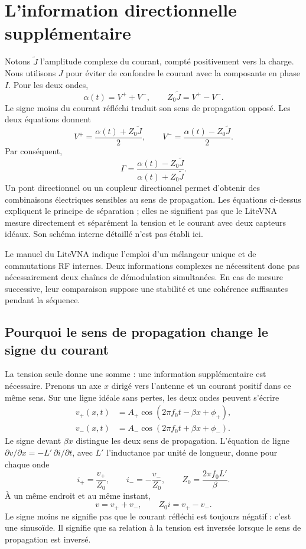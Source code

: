 \documentclass[11pt,a4paper]{article}
\begin{document}
\section{L'information directionnelle supplémentaire}
Notons $\widetilde J$ l'amplitude complexe du courant, compté positivement
vers la charge. Nous utilisons $J$ pour éviter de confondre le courant avec
la composante en phase $I$. Pour les deux ondes,
\begin{equation}
 \alpha(t)=V^++V^-,\qquad
 Z_0\widetilde J=V^+-V^-.
\end{equation}
Le signe moins du courant réfléchi traduit son sens de propagation opposé.
Les deux équations donnent
\begin{equation}
 \boxed{V^+=\frac{\alpha(t)+Z_0\widetilde J}{2},\qquad
 V^-=\frac{\alpha(t)-Z_0\widetilde J}{2}.}
\end{equation}
Par conséquent,
\begin{equation}
 \boxed{\Gamma=
 \frac{\alpha(t)-Z_0\widetilde J}
      {\alpha(t)+Z_0\widetilde J}.}
\end{equation}
Un pont directionnel ou un coupleur directionnel permet d'obtenir des
combinaisons électriques sensibles au sens de propagation. Les équations
ci-dessus expliquent le principe de séparation ; elles ne signifient pas
que le LiteVNA mesure directement et séparément la tension et le courant
avec deux capteurs idéaux. Son schéma interne détaillé n'est pas établi ici.

Le manuel du LiteVNA indique l'emploi d'un mélangeur unique et de
commutations RF internes. Deux informations complexes ne nécessitent donc
pas nécessairement deux chaînes de démodulation simultanées. En cas de
mesure successive, leur comparaison suppose une stabilité et une cohérence
suffisantes pendant la séquence.

\subsection{Pourquoi le sens de propagation change le signe du courant}
La tension seule donne une somme : une information supplémentaire est
nécessaire. Prenons un axe $x$ dirigé vers l'antenne et un courant positif
dans ce même sens. Sur une ligne idéale sans pertes, les deux ondes peuvent
s'écrire
\begin{align}
 v_+(x,t)&=A_+\cos(2\pi f_0t-\beta x+\phi_+),\\
 v_-(x,t)&=A_-\cos(2\pi f_0t+\beta x+\phi_-).
\end{align}
Le signe devant $\beta x$ distingue les deux sens de propagation.
L'équation de ligne $\partial v/\partial x=-L'\,\partial i/\partial t$,
avec $L'$ l'inductance par unité de longueur, donne pour chaque onde
\begin{equation}
 i_+=\frac{v_+}{Z_0},\qquad i_-=-\frac{v_-}{Z_0},
 \qquad Z_0=\frac{2\pi f_0L'}{\beta}.
\end{equation}
À un même endroit et au même instant,
\begin{equation}
 v=v_++v_-,\qquad Z_0i=v_+-v_-.
\end{equation}
Le signe moins ne signifie pas que le courant réfléchi est toujours
négatif : c'est une sinusoïde. Il signifie que sa relation à la tension
est inversée lorsque le sens de propagation est inversé.
\end{document}
